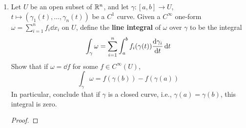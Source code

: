 \documentclass[../psets.tex]{subfiles}
\begin{document}
\begin{enumerate}[label={\textbf{2.1.\roman*.}}]
\begin{proof}
\begin{align*}
            &= 0
        \end{align*}
        where we note that any $i,j$ term in the double sum and the corresponding $j,i$ term add to zero. We can prove a similar identity for $[\bm{v}_2,[\bm{v}_3,\bm{v}_1]]$ and $[\bm{v}_3,[\bm{v}_1,\bm{v}_2]]$. Thus,
        \begin{align*}
            [\bm{v}_1,[\bm{v}_2,\bm{v}_3]]+[\bm{v}_2,[\bm{v}_3,\bm{v}_1]]+[\bm{v}_3,[\bm{v}_1,\bm{v}_2]] = 0+0+0
            = 0
        \end{align*}
        so the Lie bracket satisfies the Jacobi identity, as desired.
    \end{proof}
    \setcounter{enumi}{6}
    \item Let $U$ be an open subset of $\mathbb{R}^n$, and let $\gamma:[a,b]\to U$, $t\mapsto(\gamma_1(t),\dots,\gamma_n(t))$ be a $C^1$ curve. Given a $C^\infty$ one-form $\omega=\sum_{i=1}^nf_i\dd{x_i}$ on $U$, define the \textbf{line integral} of $\omega$ over $\gamma$ to be the integral
    \begin{equation*}
        \int_\gamma\omega = \sum_{i=1}^n\int_a^bf_i(\gamma(t))\dv{\gamma_i}{t}\dd{t}
    \end{equation*}
    Show that if $\omega=\dd{f}$ for some $f\in C^\infty(U)$,
    \begin{equation*}
        \int_\gamma\omega = f(\gamma(b))-f(\gamma(a))
    \end{equation*}
    In particular, conclude that if $\gamma$ is a closed curve, i.e., $\gamma(a)=\gamma(b)$, this integral is zero.
    \begin{proof}




\end{proof}
\end{enumerate}
\end{document}
